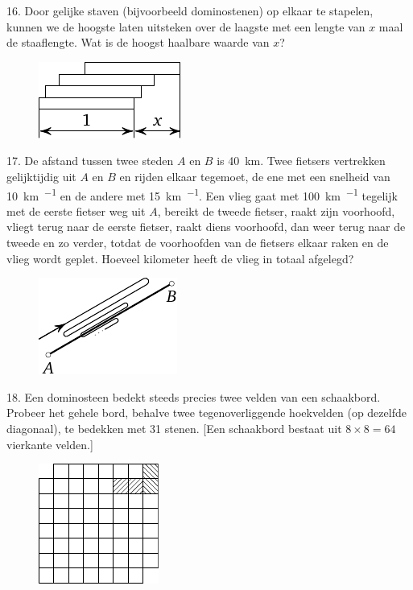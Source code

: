 \begin{problem}{16.}
	Door gelijke staven (bijvoorbeeld dominostenen) op elkaar te stapelen, kunnen we de hoogste laten uitsteken over de laagste met een lengte van $x$ maal de staaflengte. Wat is de hoogst haalbare waarde van $x$?
	\begin{figure}
		\includegraphics{resources/taskbook-97}
	\end{figure}
\end{problem}

\begin{problem}{17.}
	De afstand tussen twee steden $A$ en $B$ is \SI{40}{\km}. Twee fietsers vertrekken gelijktijdig uit $A$ en $B$ en rijden elkaar tegemoet, de ene met een snelheid van \SI{10}{\km\per\uur} en de andere met \SI{15}{\km\per\uur}. Een vlieg gaat met \SI{100}{\km\per\uur} tegelijk met de eerste fietser weg uit $A$, bereikt de tweede fietser, raakt zijn voorhoofd, vliegt terug naar de eerste fietser, raakt diens voorhoofd, dan weer terug naar de tweede en zo verder, totdat de voorhoofden van de fietsers elkaar raken en de vlieg wordt geplet. Hoeveel kilometer heeft de vlieg in totaal afgelegd?
	\begin{figure}
		\includegraphics{resources/taskbook-1}
	\end{figure}
\end{problem}

\begin{problem}{18.}
	Een dominosteen bedekt steeds precies twee velden van een schaakbord. Probeer het gehele bord, behalve twee tegenoverliggende hoekvelden (op dezelfde diagonaal), te bedekken met 31 stenen. [Een schaakbord bestaat uit $8 \times 8 = 64$ vierkante velden.]
	\begin{figure}
		\includegraphics{resources/taskbook-2}
	\end{figure}
\end{problem}

